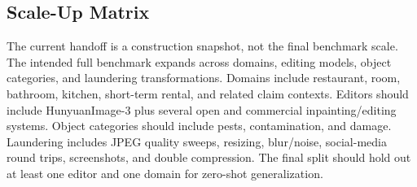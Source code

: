 \subsection{Scale-Up Matrix}

The current handoff is a construction snapshot, not the final benchmark scale. The intended full benchmark expands across domains, editing models, object categories, and laundering transformations. Domains include restaurant, room, bathroom, kitchen, short-term rental, and related claim contexts. Editors should include HunyuanImage-3 plus several open and commercial inpainting/editing systems. Object categories should include pests, contamination, and damage. Laundering includes JPEG quality sweeps, resizing, blur/noise, social-media round trips, screenshots, and double compression. The final split should hold out at least one editor and one domain for zero-shot generalization.

